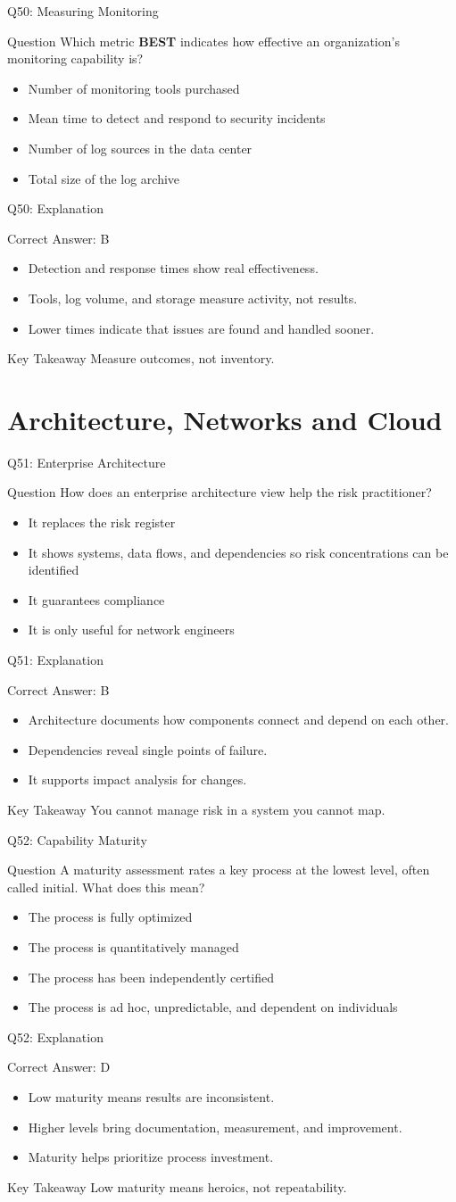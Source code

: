 \documentclass[aspectratio=169]{beamer}
\newcommand{\hq}[7]{%
	\begin{frame}{Q#1: #2}
		\begin{block}{Question}
			#3
		\end{block}
		\begin{itemize}
			#4
		\end{itemize}
	\end{frame}
	\begin{frame}{Q#1: Explanation}
		\begin{block}{Correct Answer: #5}
			\begin{itemize}
				#6
			\end{itemize}
		\end{block}
		\begin{alertblock}{Key Takeaway}
			#7
		\end{alertblock}
	\end{frame}
}
\begin{document}
	\hq{50}{Measuring Monitoring}
	{Which metric \textbf{BEST} indicates how effective an organization's monitoring capability is?}
	{\item[\textbf{(A)}] Number of monitoring tools purchased
		\item[\textbf{(B)}] Mean time to detect and respond to security incidents
		\item[\textbf{(C)}] Number of log sources in the data center
		\item[\textbf{(D)}] Total size of the log archive}
	{B}
	{\item Detection and response times show real effectiveness.
		\item Tools, log volume, and storage measure activity, not results.
		\item Lower times indicate that issues are found and handled sooner.}
	{Measure outcomes, not inventory.}
	
	\section{Architecture, Networks and Cloud}
	
	\hq{51}{Enterprise Architecture}
	{How does an enterprise architecture view help the risk practitioner?}
	{\item[\textbf{(A)}] It replaces the risk register
		\item[\textbf{(B)}] It shows systems, data flows, and dependencies so risk concentrations can be identified
		\item[\textbf{(C)}] It guarantees compliance
		\item[\textbf{(D)}] It is only useful for network engineers}
	{B}
	{\item Architecture documents how components connect and depend on each other.
		\item Dependencies reveal single points of failure.
		\item It supports impact analysis for changes.}
	{You cannot manage risk in a system you cannot map.}
	
	\hq{52}{Capability Maturity}
	{A maturity assessment rates a key process at the lowest level, often called initial. What does this mean?}
	{\item[\textbf{(A)}] The process is fully optimized
		\item[\textbf{(B)}] The process is quantitatively managed
		\item[\textbf{(C)}] The process has been independently certified
		\item[\textbf{(D)}] The process is ad hoc, unpredictable, and dependent on individuals}
	{D}
	{\item Low maturity means results are inconsistent.
		\item Higher levels bring documentation, measurement, and improvement.
		\item Maturity helps prioritize process investment.}
	{Low maturity means heroics, not repeatability.}
	
\end{document}
